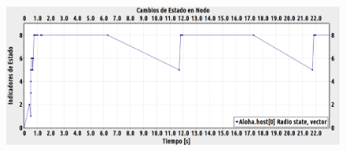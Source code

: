 \begin{justify}
\begin{figure}[!b]
\includegraphics[width=13cm,height=30cm,keepaspectratio]{images/cambioestado1nodo-ideal.eps}

\end{figure}
\end{justify}
